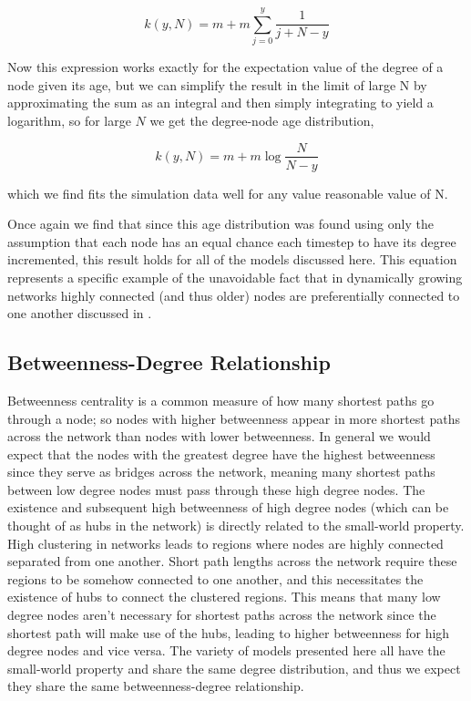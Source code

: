 \documentclass[aps,pre,reprint,superscriptaddress,amsmath,amssymb]{revtex4-1}
\begin{document}
\[k(y,N) = m + m\sum_{j=0}^{y} \frac{1}{j+N-y}\]

Now this expression works exactly for the expectation value of the degree of a node given its age, but we can simplify the result in the limit of large N by approximating the sum as an integral and then simply integrating to yield a logarithm, so for large $N$ we get the degree-node age distribution,

\[k(y,N) = m + m\log{\frac{N}{N-y}}\]

which we find fits the simulation data well for any value reasonable value of N.
 
Once again we find that since this age distribution was found using only the assumption that each node has an equal chance each timestep to have its degree incremented, this result holds for all of the models discussed here.
This equation represents a specific example of the unavoidable fact that in dynamically growing networks highly connected (and thus older) nodes are preferentially connected to one another discussed in \cite{reallyrandom}.


\subsection{Betweenness-Degree Relationship}	%
Betweenness centrality is a common measure of how many shortest paths go through a node; so nodes with higher betweenness appear in more shortest paths across the network than nodes with lower betweenness.
In general we would expect that the nodes with the greatest degree have the highest betweenness since they serve as bridges across the network, meaning many shortest paths between low degree nodes must pass through these high degree nodes.
The existence and subsequent high betweenness of high degree nodes (which can be thought of as hubs in the network) is directly related to the small-world property.
High clustering in networks leads to regions where nodes are highly connected separated from one another.
Short path lengths across the network require these regions to be somehow connected to one another, and this necessitates the existence of hubs to connect the clustered regions.
This means that many low degree nodes aren't necessary for shortest paths across the network since the shortest path will make use of the hubs, leading to higher betweenness for high degree nodes and vice versa.
The variety of models presented here all have the small-world property and share the same degree distribution, and thus we expect they share the same betweenness-degree relationship.
\end{document}
